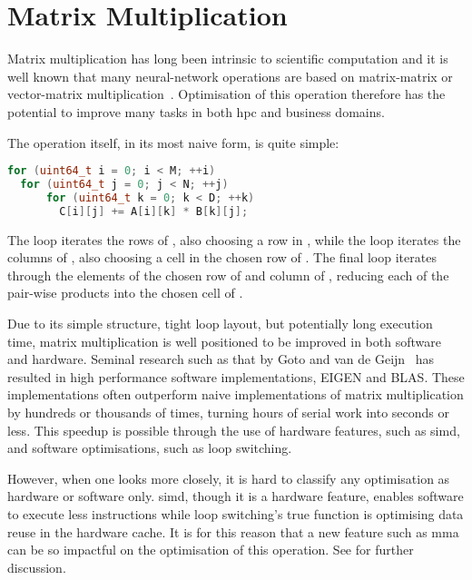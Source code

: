 \documentclass[\main/thesis.tex]{subfiles}
\begin{document}
\section{Matrix Multiplication}
Matrix multiplication has long been intrinsic to scientific computation and it is well known that many neural-network operations are based on matrix-matrix or vector-matrix multiplication~\autocite{rojas1996neural,blue1992training}.
Optimisation of this operation therefore has the potential to improve many tasks in both \gls{hpc} and business domains.

The operation itself, in its most naive form, is quite simple:
\begin{lstlisting}[caption={[Basic Matrix Multiplication]A basic matrix multiplication.},label=lst:basicmatmul,language=C++,columns=flexible,morekeywords=uint64_t]
for (uint64_t i = 0; i < M; ++i)
  for (uint64_t j = 0; j < N; ++j)
      for (uint64_t k = 0; k < D; ++k)
        C[i][j] += A[i][k] * B[k][j];
\end{lstlisting}
The  loop iterates the rows of , also choosing a row in , while the  loop iterates the columns of , also choosing a cell in the chosen row of .
The final  loop iterates through the elements of the chosen row of  and column of , reducing each of the pair-wise products into the chosen cell of .

Due to its simple structure, tight loop layout, but potentially long execution time, matrix multiplication is well positioned to be improved in both software and hardware.
Seminal research such as that by Goto and van de Geijn~\autocite{goto2008anatomy} has resulted in high performance software implementations, \eg EIGEN and BLAS.
These implementations often outperform naive implementations of matrix multiplication by hundreds or thousands of times, turning hours of serial work into seconds or less.
This speedup is possible through the use of hardware features, such as \gls{simd}, and software optimisations, such as loop switching.

However, when one looks more closely, it is hard to classify any optimisation as hardware or software only.
\Gls{simd}, though it is a hardware feature, enables software to execute less instructions while loop switching's true function is optimising data reuse in the hardware cache.
It is for this reason that a new feature such as \gls{mma} can be so impactful on the optimisation of this operation.
See  for further discussion.
\end{document}
